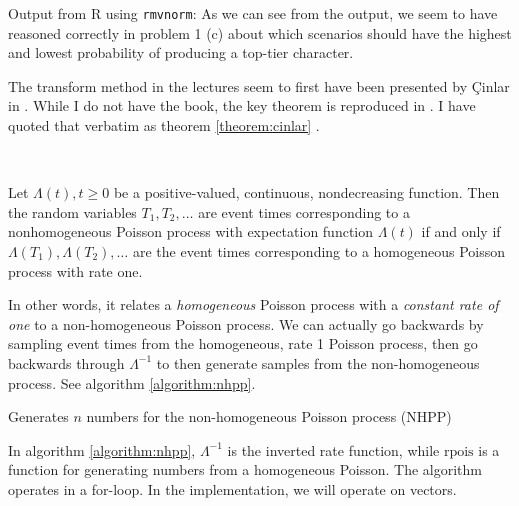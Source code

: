 \documentclass[a4paper,english,12pt]{article}
\begin{document}
Output from R using \texttt{rmvnorm}:
As we can see from the output, we seem to have reasoned correctly in problem 1
(c) about which scenarios should have the highest and lowest probability of
producing a top-tier character.

The transform method in the lectures seem to first have been presented by
Çinlar in \cite[p.~96]{cinlar}. While I do not have the book, the key theorem 
is reproduced in \cite{generating}. I have quoted that verbatim as
theorem \ref{theorem:cinlar} .

~\begin{theorem}
  \label{theorem:cinlar}
  Let $\Lambda(t), t \geqslant 0$ be a positive-valued, continuous,
  nondecreasing function. Then the random variables $T_1, T_2, \dots$ are event
  times corresponding to a nonhomogeneous Poisson process with expectation
  function $\Lambda(t)$ if and only if $\Lambda(T_1), \Lambda(T_2), \dots$ are
  the event times corresponding to a homogeneous Poisson process with rate one.
\end{theorem}

In other words, it relates a \textit{homogeneous} Poisson process with a
\textit{constant rate of one} to a non-homogeneous Poisson process. We can
actually go backwards by sampling event times from the homogeneous, rate 1
Poisson process, then go backwards through $\Lambda^{-1}$ to then generate
samples from the non-homogeneous process. See algorithm \vref{algorithm:nhpp}.

\begin{algorithm}
  \caption{Generates $n$ numbers for the non-homogeneous Poisson process (NHPP)}
  \label{algorithm:nhpp}
  \begin{algorithmic}[1]
         
      \EndFor
      \State {}
    \EndFunction
  \end{algorithmic}
\end{algorithm}

In algorithm \vref{algorithm:nhpp}, $\Lambda^{-1}$ is the inverted rate
function, while $\textrm{rpois}$ is a function for generating numbers from a
homogeneous Poisson. The algorithm operates in a for-loop. In the
implementation, we will operate on vectors.
\end{document}
